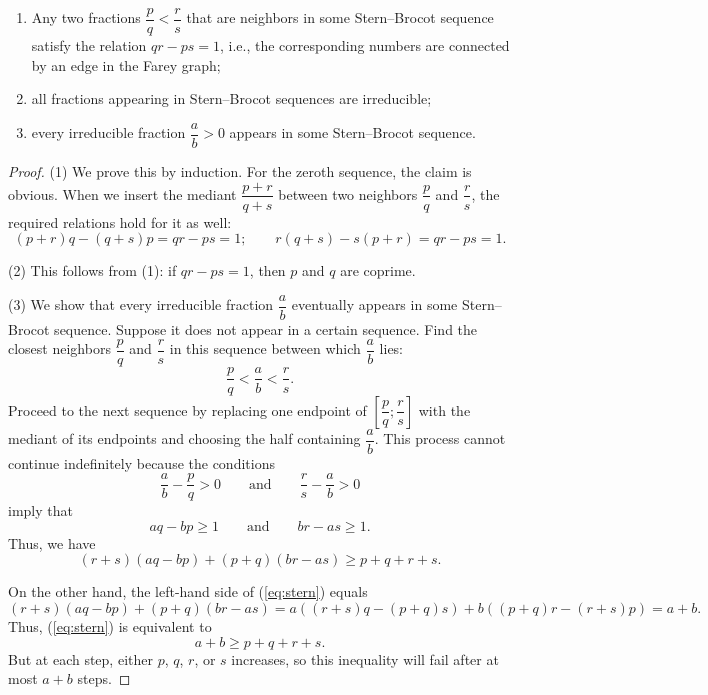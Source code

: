 \documentclass[10pt,a4paper]{amsart}
\begin{document}
\begin{theorem}\label{thm:stern}
\begin{enumerate} 
\item Any two fractions $\dfrac pq<\dfrac rs$ that are neighbors in some Stern--Brocot sequence satisfy the relation $qr-ps=1$, i.e., the corresponding numbers are connected by an edge in the Farey graph;

\item all fractions appearing in Stern--Brocot sequences are irreducible;

\item every irreducible fraction $\dfrac ab>0$ appears in some Stern--Brocot sequence.
\end{enumerate}
\end{theorem}

\begin{proof}
(1) We prove this by induction. For the zeroth sequence, the claim is obvious. When we insert the mediant $\dfrac {p+r}{q+s}$ between two neighbors $\dfrac pq$ and $\dfrac rs$, the required relations hold for it as well:
\[
(p+r)q-(q+s)p=qr-ps=1;\qquad r(q+s)-s(p+r)=qr-ps=1.
\]

(2) This follows from (1): if $qr-ps=1$, then $p$ and $q$ are coprime.

(3) We show that every irreducible fraction $\dfrac ab$ eventually appears in some Stern--Brocot sequence. Suppose it does not appear in a certain sequence. Find the closest neighbors $\dfrac pq$ and $\dfrac rs$ in this sequence between which $\dfrac ab$ lies:
\[
\dfrac pq< \dfrac ab< \dfrac rs.
\]
Proceed to the next sequence by replacing one endpoint of $\left[\dfrac pq;\dfrac rs\right]$ with the mediant of its endpoints and choosing the half containing $\dfrac ab$. This process cannot continue indefinitely because the conditions
\[
\dfrac ab-\dfrac pq>0 \qquad\text{and}\qquad \dfrac rs-\dfrac ab>0
\]
imply that
\[
aq-bp\geq 1 \qquad\text{and}\qquad br-as\geq 1.
\]
Thus, we have
\begin{equation}\label{eq:stern}
(r+s)(aq-bp)+(p+q)(br-as)\geq p+q+r+s.
\end{equation}

On the other hand, the left-hand side of (\ref{eq:stern}) equals
\[
(r+s)(aq-bp)+(p+q)(br-as) = a((r+s)q-(p+q)s) + b((p+q)r-(r+s)p) = a+b.
\]
Thus, (\ref{eq:stern}) is equivalent to
\[
a+b\geq p+q+r+s.
\]
But at each step, either $p$, $q$, $r$, or $s$ increases, so this inequality will fail after at most $a+b$ steps.
\end{proof}
\end{document}
